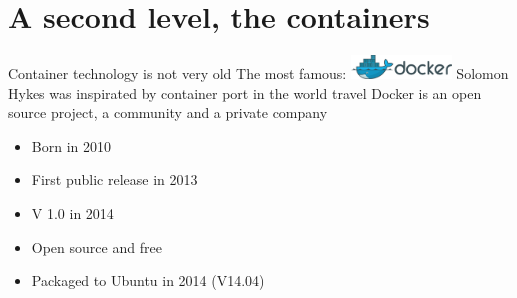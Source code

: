 \section{A second level, the containers}
\begin{frame}
Container technology is not very old \newline
\vspace{0.5cm}
The most famous: \includegraphics[width=0.2\textwidth]{images/docker_logo2.png} \newline
\vspace{0.5cm}
Solomon Hykes was inspirated by container port in the world travel \newline
\vspace{0.5cm}
 \newline
Docker is an open source project, a community and a private company 
\end{frame}

\begin{frame}[<+->]
\begin{itemize}
\item Born in 2010
\item First public release in 2013
\item V 1.0 in 2014
\item Open source and free
\item Packaged to Ubuntu in 2014 (V14.04)
\end{itemize}
\end{frame}

